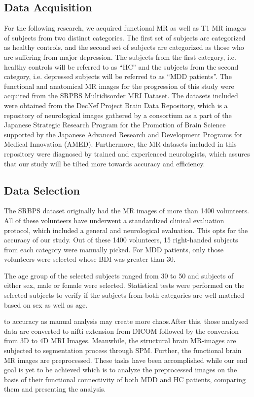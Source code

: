 \documentclass{article}
\begin{document}
\subsection{Data Acquisition}%
\label{sub:data_acquisition}

For the following research, we acquired functional MR as well as T1 MR
images of subjects from two distinct categories. The first set of
subjects are categorized as healthy controls, and the second set of
subjects are categorized as those who are suffering from major
depression. The subjects from the first category, i.e. healthy
controls will be referred to as ``HC'' and the subjects from the
second category, i.e. depressed subjects will be referred to as ``MDD
patients''. The functional and anatomical MR images for the
progression of this study were acquired from the SRPBS Multidisorder
MRI Dataset. The datasets included were obtained from the DecNef
Project Brain Data Repository, which is a repository of neurological
images gathered by a consortium as a part of the Japanese Strategic
Research Program for the Promotion of Brain Science supported by the
Japanese Advanced Research and Development Programs for Medical
Innovation (AMED). Furthermore, the MR datasets included in this
repository were diagnosed by trained and experienced neurologists,
which assures that our study will be tilted more towards accuracy and
efficiency.

\subsection{Data Selection}%
\label{sub:data_selection}

The SRBPS dataset originally had the MR images of more than 1400
volunteers. All of these volunteers have underwent a standardized
clinical evaluation protocol, which included a general and
neurological evaluation. This opts for the accuracy of our study. Out
of these 1400 volunteers, 15 right-handed subjects from each category
were manually picked. For MDD patients, only those volunteers were
selected whose BDI was greater than 30.

The age group of the selected subjects ranged from 30 to 50 and
subjects of either sex, male or female were selected. Statistical
tests were performed on the selected subjects to verify if the
subjects from both categories are well-matched based on sex as well as
age.

to accuracy as manual analysis may create more chaos.After this, those
analysed data are converted to nifti extension from DICOM followed by
the conversion from 3D to 4D MRI Images.  Meanwhile, the structural
brain MR-images are subjected to segmentation process through SPM.
Further, the functional brain MR images are preprocessed. These tasks
have been accomplished while our end goal is yet to be achieved which
is to analyze the preprocessed images on the basis of their functional
connectivity of both MDD and HC patients, comparing them and
presenting the analysis.
\end{document}
